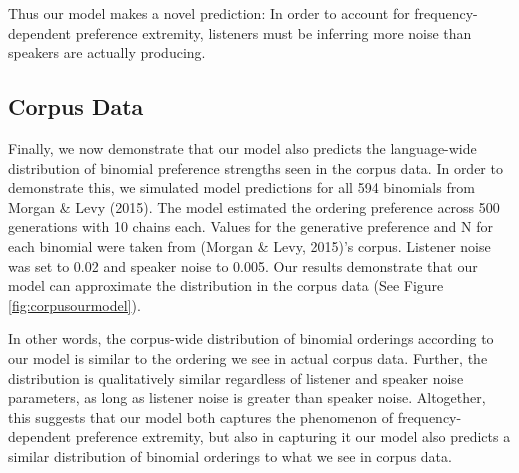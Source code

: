 \documentclass[10pt, letterpaper]{article}
\begin{document}
Thus our model makes a novel prediction: In order to account for
frequency-dependent preference extremity, listeners must be inferring
more noise than speakers are actually producing.

\hypertarget{corpus-data}{%
\subsection{Corpus Data}\label{corpus-data}}

Finally, we now demonstrate that our model also predicts the
language-wide distribution of binomial preference strengths seen in the
corpus data. In order to demonstrate this, we simulated model
predictions for all 594 binomials from Morgan \& Levy (2015). The model
estimated the ordering preference across 500 generations with 10 chains
each. Values for the generative preference and N for each binomial were
taken from (Morgan \& Levy, 2015)'s corpus. Listener noise was set to
0.02 and speaker noise to 0.005. Our results demonstrate that our model
can approximate the distribution in the corpus data (See Figure
\ref{fig:corpusourmodel}).

In other words, the corpus-wide distribution of binomial orderings
according to our model is similar to the ordering we see in actual
corpus data. Further, the distribution is qualitatively similar
regardless of listener and speaker noise parameters, as long as listener
noise is greater than speaker noise. Altogether, this suggests that our
model both captures the phenomenon of frequency-dependent preference
extremity, but also in capturing it our model also predicts a similar
distribution of binomial orderings to what we see in corpus data.
\end{document}
